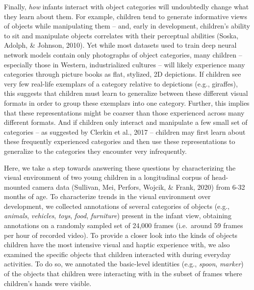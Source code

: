 \documentclass[10pt, letterpaper]{article}
\begin{document}
Finally, \emph{how} infants interact with object categories will
undoubtedly change what they learn about them. For example, children
tend to generate informative views of objects while manipulating them --
and, early in development, children's ability to sit and manipulate
objects correlates with their perceptual abilities (Soska, Adolph, \&
Johnson, 2010). Yet while most datasets used to train deep neural
network models contain only photographs of object categories, many
children -- especially those in Western, industrialized cultures -- will
likely experience many categories through picture books as flat,
stylized, 2D depictions. If children see very few real-life exemplars of
a category relative to depictions (e.g., giraffes), this suggests that
children must learn to generalize between these different visual formats
in order to group these exemplars into one category. Further, this
implies that these representations might be coarser than those
experienced across many different formats. And if children only interact
and manipulate a few small set of categories -- as suggested by Clerkin
et al., 2017 -- children may first learn about these frequently
experienced categories and then use these representations to generalize
to the categories they encounter very infrequently.

Here, we take a step towards answering these questions by characterizing
the visual environment of two young children in a longitudinal corpus of
head-mounted camera data (Sullivan, Mei, Perfors, Wojcik, \& Frank,
2020) from 6-32 months of age. To characterize trends in the visual
environment over development, we collected annotations of several
categories of objects (e.g., \emph{animals}, \emph{vehicles},
\emph{toys}, \emph{food}, \emph{furniture}) present in the infant view,
obtaining annotations on a randomly sampled set of 24,000 frames
(i.e.~around 59 frames per hour of recorded video). To provide a closer
look into the kinds of objects children have the most intensive visual
and haptic experience with, we also examined the specific objects that
children interacted with during everyday activities. To do so, we
annotated the basic-level identities (e.g., \emph{spoon}, \emph{marker})
of the objects that children were interacting with in the subset of
frames where children's hands were visible.
\end{document}
